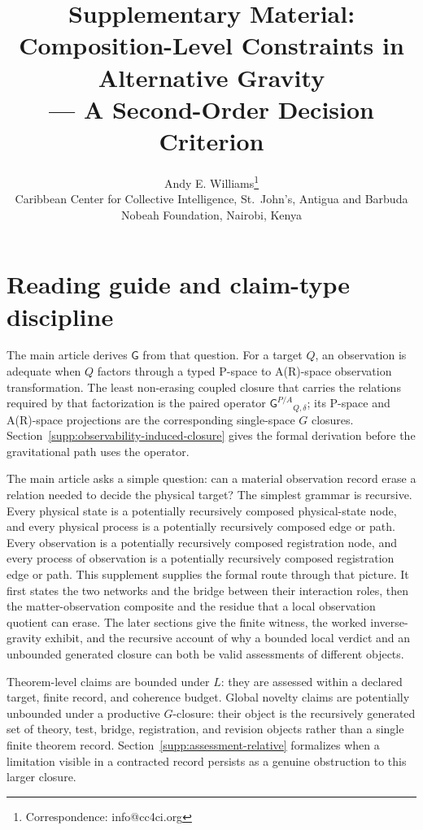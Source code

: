 \documentclass[11pt]{article}
\title{Supplementary Material: Composition-Level Constraints in Alternative Gravity\\
--- A Second-Order Decision Criterion}
\author{Andy E. Williams\thanks{Correspondence: info@cc4ci.org}\\[4pt]
\small Caribbean Center for Collective Intelligence, St.~John's, Antigua and Barbuda\\
\small Nobeah Foundation, Nairobi, Kenya}
\date{}
\newcommand{\GOp}{\ensuremath{\mathsf{G}}}
\newcommand{\GPair}{\ensuremath{\mathsf{G}^{P/A}}}
\theoremstyle{definition}
\begin{document}
\maketitle

\section*{Reading guide and claim-type discipline}

The main article derives $\GOp$ from that question. For a target $Q$, an
observation is adequate when $Q$ factors through a typed P-space to A(R)-space
observation transformation. The least non-erasing coupled closure that carries the
relations required by that factorization is the paired operator
$\GPair_{Q,\delta}$; its P-space and A(R)-space projections are the corresponding
single-space $G$ closures. Section~\ref{supp:observability-induced-closure} gives
the formal derivation before the gravitational path uses the operator.

The main article asks a simple question: can a material observation record erase a
relation needed to decide the physical target? The simplest grammar is recursive.
Every physical state is a potentially recursively composed physical-state node, and
every physical process is a potentially recursively composed edge or path. Every
observation is a potentially recursively composed registration node, and every
process of observation is a potentially recursively composed registration edge or
path. This supplement supplies the formal route through that picture. It first
states the two networks and the bridge between their interaction roles, then the
matter-observation composite and the residue that a local observation quotient can
erase. The later sections give the finite witness, the worked inverse-gravity
exhibit, and the recursive account of why a bounded local verdict and an unbounded
generated closure can both be valid assessments of different objects.

Theorem-level claims are bounded under $L$: they are assessed within a declared
target, finite record, and coherence budget. Global novelty claims are potentially
unbounded under a productive $G$-closure: their object is the recursively generated
set of theory, test, bridge, registration, and revision objects rather than a
single finite theorem record. Section~\ref{supp:assessment-relative} formalizes
when a limitation visible in a contracted record persists as a genuine obstruction
to this larger closure.
\end{document}
